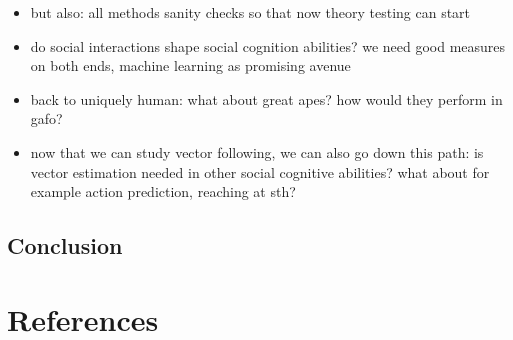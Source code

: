 \documentclass[
]{scrbook}
\providecommand{\tightlist}{%
  \setlength{\itemsep}{0pt}\setlength{\parskip}{0pt}}
\begin{document}
\begin{itemize}
\tightlist
\item
  but also: all methods sanity checks so that now theory testing can start
\item
  do social interactions shape social cognition abilities? we need good measures on both ends, machine learning as promising avenue
\item
  back to uniquely human: what about great apes? how would they perform in gafo?
\item
  now that we can study vector following, we can also go down this path: is vector estimation needed in other social cognitive abilities? what about for example action prediction, reaching at sth?
\end{itemize}

\section{Conclusion}\label{conclusion}

\backmatter

\chapter{References}\label{references}
\end{document}
